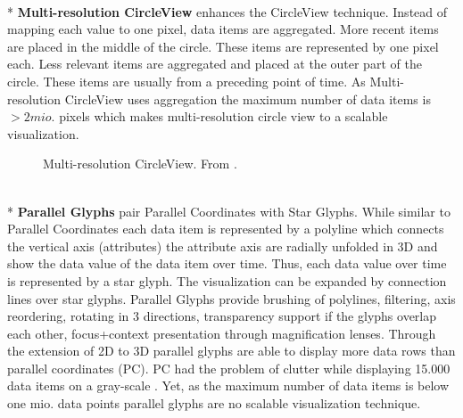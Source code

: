 \\*
\textbf{Multi-resolution CircleView} enhances the CircleView technique. Instead of mapping each value to one pixel, data items are aggregated. More recent items are placed in the middle of the circle. These items are represented by one pixel each. Less relevant items are aggregated and placed at the outer part of the circle. These items are usually from a preceding point of time. As Multi-resolution CircleView uses aggregation the maximum number of data items is $> 2mio.$ pixels which makes multi-resolution circle view to a scalable visualization.
\begin{figure}[H]
    \centering
    \caption{Multi-resolution CircleView. From \cite{Keim2005}.}
    \label{fig:multiresolutioncircleview}
\end{figure}
\\*
\textbf{Parallel Glyphs} pair Parallel Coordinates with Star Glyphs. While similar to Parallel Coordinates each data item is represented by a polyline which connects the vertical axis (attributes) the attribute axis are radially unfolded in 3D and show the data value of the data item over time. Thus, each data value over time is represented by a star glyph. The visualization can be expanded by connection lines over star glyphs. Parallel Glyphs provide brushing of polylines, filtering, axis reordering, rotating in 3 directions, transparency support if the glyphs overlap each other, focus+context presentation through magnification lenses. Through the extension of 2D to 3D parallel glyphs are able to display more data rows than parallel coordinates (PC). PC had the problem of clutter while displaying 15.000 data items on a gray-scale \cite{Keimb}. Yet, as the maximum number of data items is below one mio. data points parallel glyphs are no scalable visualization technique. 

